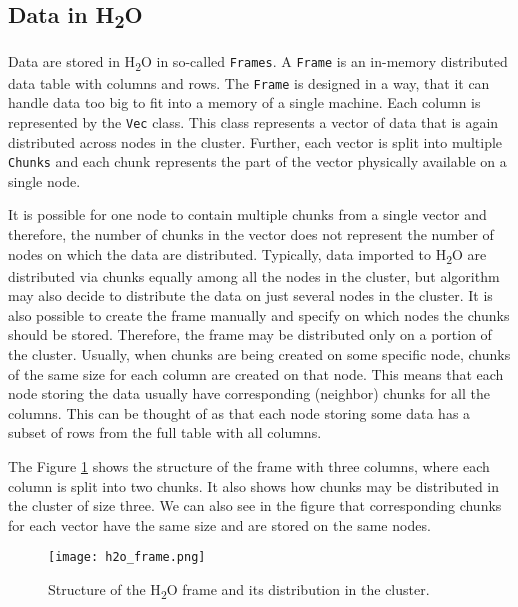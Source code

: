 \subsection{Data in H\textsubscript{2}O}
Data are stored in H\textsubscript{2}O in so-called \texttt{Frames}. A \texttt{Frame} is an in-memory distributed data table with columns and rows. The \texttt{Frame} is designed in a way, that it can handle data too big to fit into a memory of a single machine. Each column is represented by the \texttt{Vec} class. This class represents a vector of data that is again distributed across nodes in the cluster. Further, each vector is split into multiple \texttt{Chunks} and each chunk represents the part of the vector physically available on a single node. 

It is possible for one node to contain multiple chunks from a single vector and therefore, the number of chunks in the vector does not represent the number of nodes on which the data are distributed. Typically, data imported to H\textsubscript{2}O are distributed via chunks equally among all the nodes in the cluster, but algorithm may also decide to distribute the data on just several nodes in the cluster. It is also possible to create the frame manually and specify on which nodes the chunks should be stored. Therefore, the frame may be distributed only on a portion of the cluster. Usually, when chunks are being created on some specific node, chunks of the same size for each column are created on that node. This means that each node storing the data usually have corresponding (neighbor) chunks for all the columns. This can be thought of as that each node storing some data has a subset of rows from the full table with all columns.

The Figure \ref{fig:h2o_frame} shows the structure of the frame with three columns, where each column is split into two chunks. It also shows how chunks may be distributed in the cluster of size three. We can also see in the figure that corresponding chunks for each vector have the same size and are stored on the same nodes. 

	\begin{figure}
		\centering
		\texttt{[image: h2o\_frame.png]}
		\caption{Structure of the H\textsubscript{2}O frame and its distribution in the cluster.}
		\label{fig:h2o_frame}
	\end{figure}

